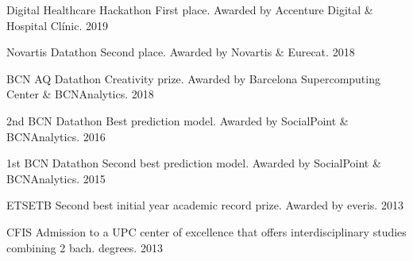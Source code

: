
\begin{cvhonors}

  \cvhonor
    {Digital Healthcare Hackathon}
    {First place. Awarded by Accenture Digital \& Hospital Clínic.}
    {}
    {2019}

  \cvhonor
    {Novartis Datathon}
    {Second place. Awarded by Novartis \& Eurecat.}
    {}
    {2018}

  \cvhonor
    {BCN AQ Datathon}
    {Creativity prize. Awarded by Barcelona Supercomputing Center \& BCNAnalytics.}
    {}
    {2018}

  \cvhonor
    {2nd BCN Datathon}
    {Best prediction model. Awarded by SocialPoint \& BCNAnalytics.}
    {}
    {2016}

  \cvhonor
    {1st BCN Datathon}
    {Second best prediction model. Awarded by SocialPoint \& BCNAnalytics.}
    {}
    {2015}

  \cvhonor
    {ETSETB}
    {Second best initial year academic record prize. Awarded by everis.}
    {}
    {2013}

  \cvhonor
    {CFIS}
    {Admission to a UPC center of excellence that offers interdisciplinary studies combining 2 bach. degrees.}
    {}
    {2013}

\end{cvhonors}
